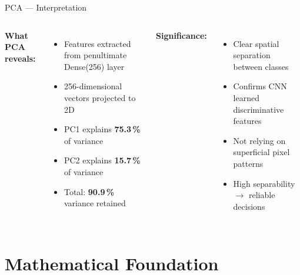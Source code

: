 \documentclass[aspectratio=169,11pt]{beamer}
\begin{document}
\begin{frame}{PCA --- Interpretation}
  \begin{columns}[T]
    \textbf{What PCA reveals:}
    \begin{itemize}\setlength\itemsep{4pt}
        \item Features extracted from penultimate Dense(256) layer
        \item 256-dimensional vectors projected to 2D
        \item PC1 explains \textbf{75.3\,\%} of variance
        \item PC2 explains \textbf{15.7\,\%} of variance
        \item Total: \textbf{90.9\,\%} variance retained
    \end{itemize}
    \textbf{Significance:}
    \begin{itemize}\setlength\itemsep{4pt}
        \item Clear spatial separation between classes
        \item Confirms CNN learned discriminative features
        \item Not relying on superficial pixel patterns
        \item High separability $\rightarrow$ reliable decisions
    \end{itemize}
    \vspace{0.3cm}
  \end{columns}
\end{frame}

\section{Mathematical Foundation}
\end{document}
